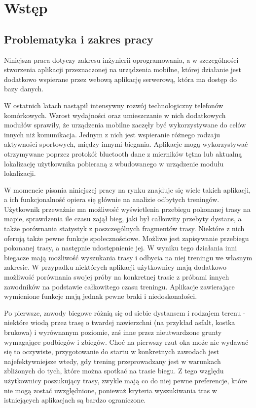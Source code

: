 \chapter{Wstęp}\label{chap:introduction}

\section{Problematyka i zakres pracy}
Niniejsza praca dotyczy zakresu inżynierii oprogramowania, a w szczególności stworzenia aplikacji przeznaczonej na urządzenia mobilne, której działanie jest dodatkowo wspierane przez webową aplikację serwerową, która ma dostęp do bazy danych.

W ostatnich latach nastąpił intensywny rozwój technologiczny telefonów komórkowych. Wzrost wydajności oraz umieszczanie w nich dodatkowych modułów sprawiły, że urządzenia mobilne zaczęły być wykorzystywane do celów innych niż komunikacja. Jednym z nich jest wspieranie różnego rodzaju aktywności sportowych, między innymi biegania. Aplikacje mogą wykorzystywać otrzymywane poprzez protokół bluetooth dane z mierników tętna lub aktualną lokalizację użytkownika pobieraną z wbudowanego w urządzenie modułu lokalizacji.

W momencie pisania niniejszej pracy na rynku znajduje się wiele takich aplikacji, a ich funkcjonalność opiera się głównie na analizie odbytych treningów. Użytkownik przeważnie ma możliwość wyświetlenia przebiegu pokonanej trasy na mapie, sprawdzenia ile czasu zajął bieg, jaki był całkowity przebyty dystans, a także porównania statystyk z poszczególnych fragmentów trasy. Niektóre z nich oferują także pewne funkcje społecznościowe. Możliwe jest zapisywanie przebiegu pokonanej trasy, a następnie udostępnienie jej. W wyniku tego działania inni biegacze mają możliwość wyszukania trasy i odbycia na niej treningu we własnym zakresie. W przypadku niektórych aplikacji użytkownicy mają dodatkowo możliwość porównania swojej próby na konkretnej trasie z próbami innych zawodników na podstawie całkowitego czasu treningu. Aplikacje zawierające wymienione funkcje mają jednak pewne braki i niedoskonałości.

Po pierwsze, zawody biegowe różnią się od siebie dystansem i rodzajem terenu - niektóre wiodą przez trasę o twardej nawierzchni (na przykład asfalt, kostka brukowa) i wyrównanym poziomie, zaś inne przez nieutwardzone grunty wymagające podbiegów i zbiegów. Choć na pierwszy rzut oka może nie wydawać się to oczywiste, przygotowanie do startu w konkretnych zawodach jest najefektywniejsze wtedy, gdy trening przeprowadzany jest w warunkach zbliżonych do tych, które można spotkać na trasie biegu. Z tego względu użytkownicy poszukujący trasy, zwykle mają co do niej pewne preferencje, które nie mogą zostać uwzględnione, ponieważ kryteria wyszukiwania tras w istniejących aplikacjach są bardzo ograniczone.

